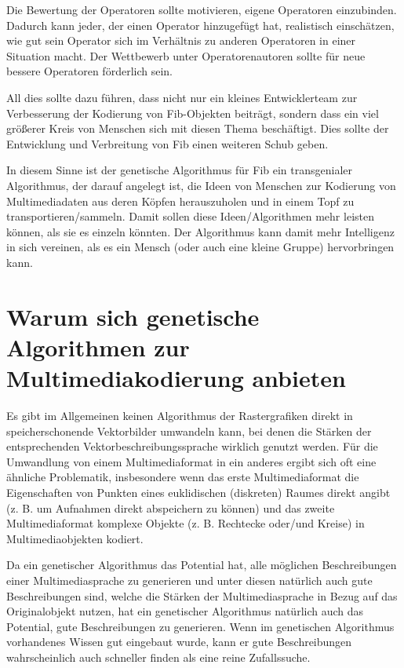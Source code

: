 Die Bewertung der Operatoren sollte motivieren, eigene Operatoren einzubinden. Dadurch kann jeder, der einen Operator hinzugefügt hat, realistisch einschätzen, wie gut sein Operator sich im Verhältnis zu anderen Operatoren in einer Situation macht. Der Wettbewerb unter Operatorenautoren sollte für neue bessere Operatoren förderlich sein.


All dies sollte dazu führen, dass nicht nur ein kleines Entwicklerteam zur Verbesserung der Kodierung von Fib-Objekten beiträgt, sondern dass ein viel größerer Kreis von Menschen sich mit diesen Thema beschäftigt. Dies sollte der Entwicklung und Verbreitung von Fib einen weiteren Schub geben.

In diesem Sinne ist der genetische Algorithmus für Fib ein transgenialer Algorithmus, der darauf angelegt ist, die Ideen von Menschen zur Kodierung von Multimediadaten aus deren Köpfen herauszuholen und in einem Topf zu transportieren/sammeln. Damit sollen diese Ideen/Algorithmen mehr leisten können, als sie es einzeln könnten. Der Algorithmus kann damit mehr Intelligenz in sich vereinen, als es ein Mensch (oder auch eine kleine Gruppe) hervorbringen kann.


\section{Warum sich genetische Algorithmen zur Multimediakodierung anbieten}

Es gibt im Allgemeinen keinen Algorithmus der Rastergrafiken direkt in speicherschonende Vektorbilder umwandeln kann, bei denen die Stärken der entsprechenden Vektorbeschreibungssprache wirklich genutzt werden. Für die Umwandlung von einem Multimediaformat in ein anderes ergibt sich oft eine ähnliche Problematik, insbesondere wenn das erste Multimediaformat die Eigenschaften von Punkten eines euklidischen (diskreten) Raumes direkt angibt (z. B. um Aufnahmen direkt abspeichern zu können) und das zweite Multimediaformat komplexe Objekte (z. B. Rechtecke oder/und Kreise) in Multimediaobjekten kodiert.

Da ein genetischer Algorithmus das Potential hat, alle möglichen Beschreibungen einer Multimediasprache zu generieren und unter diesen natürlich auch gute Beschreibungen sind, welche die Stärken der Multimediasprache in Bezug auf das Originalobjekt nutzen, hat ein genetischer Algorithmus natürlich auch das Potential, gute Beschreibungen zu generieren. Wenn im genetischen Algorithmus vorhandenes Wissen gut eingebaut wurde, kann er gute Beschreibungen wahrscheinlich auch schneller finden als eine reine Zufallssuche.

